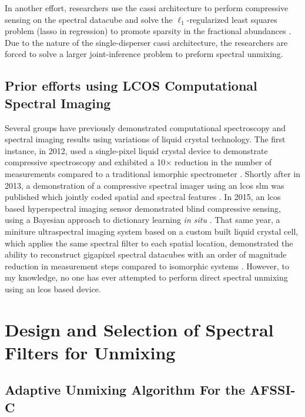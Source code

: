 In another effort, researchers use the \acrfull{cassi} architecture to perform compressive sensing on the spectral datacube and solve the $\ell_1$-regularized least squares problem (lasso in regression) to promote sparsity in the fractional abundances \cite{monsalve2015spectral}. Due to the nature of the single-disperser \gls{cassi} architecture, the researchers are forced to solve a larger joint-inference problem to preform spectral unmixing. 

\subsection{Prior efforts using LCOS Computational Spectral Imaging}

Several groups have previously demonstrated computational spectroscopy and spectral imaging results using variations of liquid crystal technology. The first instance, in 2012, used a single-pixel liquid crystal device to demonstrate compressive spectroscopy and exhibited a 10$\times$ reduction in the number of measurements compared to a traditional ismorphic spectrometer \cite{august2013compressive}. Shortly after in 2013, a demonstration of a compressive spectral imager using an \gls{lcos} \gls{slm} was published which jointly coded spatial and spectral features \cite{zhu2013coded}. In 2015, an \gls{lcos} based hyperspectral imaging sensor demonstrated blind compressive sensing, using a Bayesian approach to dictionary learning \emph{in situ} \cite{yuan2015compressive}. That same year, a miniture ultraspectral imaging system based on a custom built liquid crystal cell, which applies the same spectral filter to each spatial location, demonstrated the ability to reconstruct gigapixel spectral datacubes with an order of magnitude reduction in measurement steps compared to isomorphic systems \cite{august2016miniature}. However, to my knowledge, no one has ever attempted to perform direct spectral unmixing using an \gls{lcos} based device. 


\section{Design and Selection of Spectral Filters for Unmixing}


\subsection{Adaptive Unmixing Algorithm For the AFSSI-C}\label{sec:unmixingAlgo}


